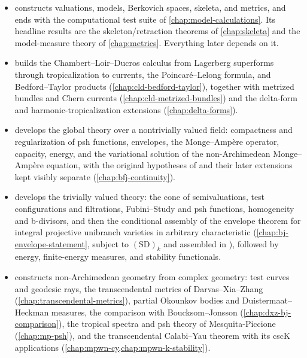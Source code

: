 \begin{itemize}
\item {} constructs valuations, models, Berkovich
spaces, skeleta, and metrics, and ends with the computational test suite of
\cref{chap:model-calculations}.  Its headline results are the
skeleton/retraction theorems of \cref{chap:skeleta} and the model-measure
theory of \cref{chap:metrics}.  Everything later depends on it.

\item {} builds the Chambert--Loir--Ducros calculus from
Lagerberg superforms through tropicalization to currents, the
Poincar\'e--Lelong formula, and Bedford--Taylor products
(\cref{chap:cld-bedford-taylor}), together with metrized bundles and Chern
currents (\cref{chap:cld-metrized-bundles}) and the delta-form and
harmonic-tropicalization extensions (\cref{chap:delta-forms}).

\item {} develops the global theory over a nontrivially valued
field: compactness and regularization of psh functions, envelopes, the
Monge--Amp\`ere operator, capacity, energy, and the variational solution of
the non-Archimedean Monge--Amp\`ere equation, with the original
hypotheses of \cite{BFJ16,BFJ15} and their later extensions kept visibly
separate (\cref{chap:bfj-continuity}).

\item {} develops the trivially valued theory: the cone of
semivaluations, test configurations and filtrations, Fubini--Study and psh
functions, homogeneity and b-divisors, and then the conditional assembly of the
envelope theorem for integral projective unibranch varieties in arbitrary
characteristic (\cref{chap:bj-envelope-statement}, subject to
$\mathrm{(SD)}_k$ and assembled in
),
followed by energy, finite-energy measures, and stability functionals.

\item {} constructs non-Archimedean geometry from complex
geometry: test curves and geodesic rays, the transcendental metrics of
Darvas--Xia--Zhang (\cref{chap:transcendental-metrics}), partial Okounkov
bodies and Duistermaat--Heckman measures, the comparison with
Boucksom--Jonsson (\cref{chap:dxz-bj-comparison}), the tropical spectra and
psh theory of Mesquita-Piccione (\cref{chap:mp-psh}), and the
transcendental Calabi--Yau theorem with its cscK applications
(\cref{chap:mpwn-cy,chap:mpwn-k-stability}).


\end{itemize}
